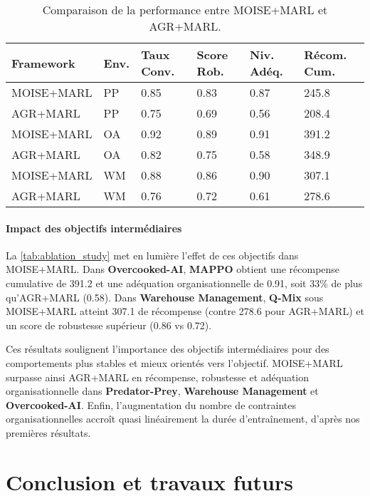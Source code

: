 \documentclass[dissemination]{jfsma}
\begin{document}
\begin{table}[h!]
    \centering
    \caption{Comparaison de la performance entre MOISE+MARL et AGR+MARL.}
    \label{tab:ablation_study}
    \footnotesize
    \renewcommand{\arraystretch}{1.1}
    \begin{tabular}{p{2.1cm}p{0.5cm}p{0.7cm}p{0.7cm}p{0.6cm}p{0.9cm}}
        \hline
        \textbf{Framework} & \textbf{Env.} & \textbf{Taux Conv.} & \textbf{Score Rob.} & \textbf{Niv. Adéq.} & \textbf{Récom. Cum.} \\ \hline
        MOISE+MARL & PP & 0.85 & 0.83 & 0.87 & 245.8 \\
        AGR+MARL & PP & 0.75 & 0.69 & 0.56 & 208.4 \\
        MOISE+MARL & OA & 0.92 & 0.89 & 0.91 & 391.2 \\
        AGR+MARL & OA & 0.82 & 0.75 & 0.58 & 348.9 \\
        MOISE+MARL & WM & 0.88 & 0.86 & 0.90 & 307.1 \\
        AGR+MARL & WM & 0.76 & 0.72 & 0.61 & 278.6 \\ \hline
    \end{tabular}
\end{table}

\paragraph{Impact des objectifs intermédiaires}
La \autoref{tab:ablation_study} met en lumière l’effet de ces objectifs dans MOISE+MARL. Dans \textbf{Overcooked-AI}, \textbf{MAPPO} obtient une récompense cumulative de 391.2 et une adéquation organisationnelle de 0.91, soit 33\% de plus qu’AGR+MARL (0.58). Dans \textbf{Warehouse Management}, \textbf{Q-Mix} sous MOISE+MARL atteint 307.1 de récompense (contre 278.6 pour AGR+MARL) et un score de robustesse supérieur (0.86 vs 0.72).

Ces résultats soulignent l’importance des objectifs intermédiaires pour des comportements plus stables et mieux orientés vers l’objectif. MOISE+MARL surpasse ainsi AGR+MARL en récompense, robustesse et adéquation organisationnelle dans \textbf{Predator-Prey}, \textbf{Warehouse Management} et \textbf{Overcooked-AI}.
%
Enfin, l’augmentation du nombre de contraintes organisationnelles accroît quasi linéairement la durée d’entraînement, d’après nos premières résultats\footnotemark[2].

\section{Conclusion et travaux futurs}
\label{sec:discussion_conclusion_future_work}
\end{document}

